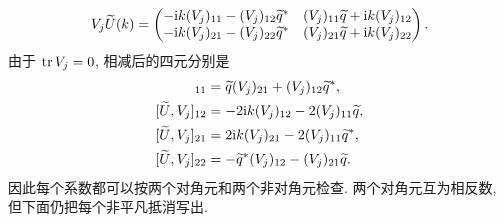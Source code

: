 \begin{equation*}
V_j\widetilde U(k)=
\begin{pmatrix}
-\mathrm{i} k(V_j)_{11}-(V_j)_{12}{\widetilde q}^{*}
&(V_j)_{11}\widetilde q+\mathrm{i} k(V_j)_{12}\\
-\mathrm{i} k(V_j)_{21}-(V_j)_{22}{\widetilde q}^{*}
&(V_j)_{21}\widetilde q+\mathrm{i} k(V_j)_{22}
\end{pmatrix}.
\end{equation*}
由于 $\operatorname{tr} V_j=0$, 相减后的四元分别是
\begin{align*}
[\widetilde U,V_j]_{11}
&=\widetilde q(V_j)_{21}+(V_j)_{12}\conj{\widetilde q},\\
[\widetilde U,V_j]_{12}
&=-2\ii k(V_j)_{12}-2(V_j)_{11}\widetilde q,\\
[\widetilde U,V_j]_{21}
&=2\ii k(V_j)_{21}-2(V_j)_{11}\conj{\widetilde q},\\
[\widetilde U,V_j]_{22}
&=-\conj{\widetilde q}(V_j)_{12}-(V_j)_{21}\widetilde q.
\end{align*}
因此每个系数都可以按两个对角元和两个非对角元检查. 两个对角元互为相反数, 但下面仍把每个非平凡抵消写出.


